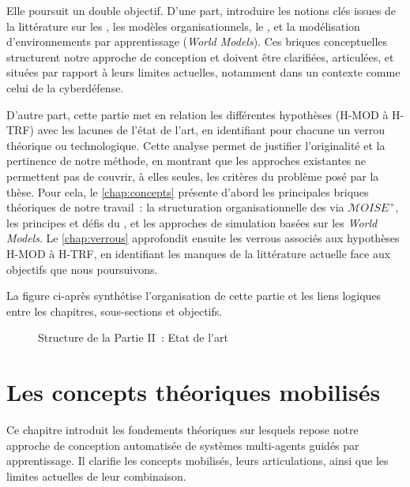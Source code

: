 Elle poursuit un double objectif. D'une part, introduire les notions clés issues de la littérature sur les , les modèles organisationnels, le , et la modélisation d'environnements par apprentissage (\textit{World Models}). Ces briques conceptuelles structurent notre approche de conception et doivent être clarifiées, articulées, et situées par rapport à leurs limites actuelles, notamment dans un contexte comme celui de la cyberdéfense.

D'autre part, cette partie met en relation les différentes hypothèses (H-MOD à H-TRF) avec les lacunes de l'état de l'art, en identifiant pour chacune un verrou théorique ou technologique. Cette analyse permet de justifier l'originalité et la pertinence de notre méthode, en montrant que les approches existantes ne permettent pas de couvrir, à elles seules, les critères du problème posé par la thèse. Pour cela, le \autoref{chap:concepts} présente d'abord les principales briques théoriques de notre travail~: la structuration organisationnelle des  via $\mathcal{M}OISE^+$, les principes et défis du , et les approches de simulation basées sur les \textit{World Models}. Le \autoref{chap:verrous} approfondit ensuite les verrous associés aux hypothèses H-MOD à H-TRF, en identifiant les manques de la littérature actuelle face aux objectifs que nous poursuivons.

La figure ci-après synthétise l'organisation de cette partie et les liens logiques entre les chapitres, sous-sections et objectifs.


\begin{figure}[h!]
  \centering
  \resizebox{\textwidth}{!}{%
    
  }
  \caption{Structure de la Partie II~: Etat de l'art}
  \label{fig:organisation_manuscrit_partie_2}
\end{figure}

\clearpage
\thispagestyle{empty}
\null
\newpage

\chapter{Les concepts théoriques mobilisés}
\label{chap:concepts}

\noindent
Ce chapitre introduit les fondements théoriques sur lesquels repose notre approche de conception automatisée de systèmes multi-agents guidés par apprentissage. Il clarifie les concepts mobilisés, leurs articulations, ainsi que les limites actuelles de leur combinaison.

